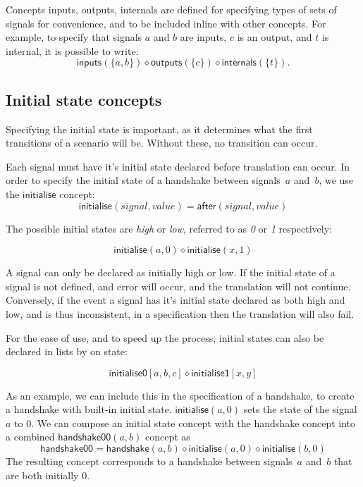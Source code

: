 \documentclass[british,conference,compsoc]{IEEEtran}
\begin{document}
Concepts \textsf{inputs}, \textsf{outputs}, \textsf{internals} are defined for
specifying types of sets of signals for convenience, and to be included inline with other
concepts. For example, to specify
that signals $a$ and $b$ are inputs, $c$ is an output, and $t$ is internal, it
is possible to write:
\[
\mathsf{inputs}(\{a, b\}) \diamond \mathsf{outputs}(\{c\}) \diamond
\mathsf{internals}(\{t\}).
\]


\subsection{Initial state concepts \label{sub:initState}}

Specifying the initial state is important, as it determines what the first transitions
of a scenario will be. Without these, no transition can occur.

Each signal must have it's initial state declared before translation can occur. 
In order to specify the initial state of a handshake between signals~$a$
and~$b$, we use the $\mathsf{initialise}$ concept:
\[
\mathsf{initialise}(\mathit{signal},\mathit{value})=\mathsf{after}(signal,
value)
\]

\noindent The possible initial states are \emph{high} or \emph{low}, referred to as \emph{0} 
or \emph{1} respectively:

\[
\mathsf{initialise}(a,0) \diamond \mathsf{initialise}(x, 1)
\]

\noindent A signal can only be declared as initially high or low. If the initial state of a signal is 
not defined, and error will occur, and the translation will not continue. Conversely, 
if the event a signal has it's initial state declared as both high and low,
and is thus inconsistent, in a specification then the translation will also fail.

For the ease of use, and to speed up the process, initial states can also be declared
in lists by on state:

\[
\mathsf{initialise0} [a, b, c] \diamond \mathsf{initialise1} [x, y]
\]


\noindent As an example, we can include this in the specification of a handshake, to 
create a handshake with built-in initial state.
$\mathsf{initialise}(a, 0)$ sets the state of the signal
$a$ to $0$. We can compose an initial state concept with the handshake concept
into a combined $\mathsf{handshake00}(a, b)$ concept as
\[
\mathsf{handshake00} = \mathsf{handshake}(a, b) \diamond \mathsf{initialise}(a, 0) \diamond
\mathsf{initialise}(b, 0)
\]
The resulting concept corresponds to a handshake between signals~$a$
and~$b$ that are both initially $0$.
\end{document}
